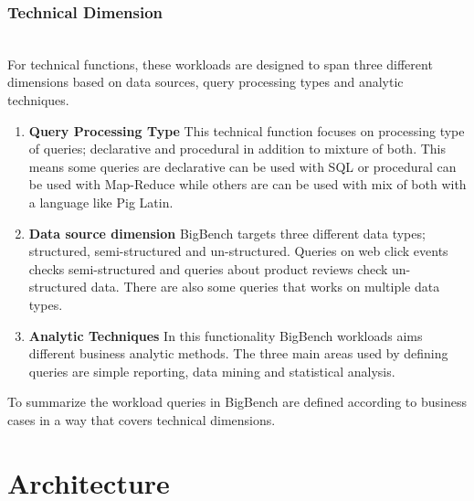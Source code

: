 \documentclass[sigconf,10pt]{acmart}
\begin{document}
\subsubsection{Technical Dimension} \hfill\\
For technical functions, these workloads are designed to span three different dimensions based on data sources, query processing types and analytic techniques.
\begin{enumerate}
    \item \textbf{Query Processing Type}
    \newline
    This technical function focuses on processing type of queries; declarative and procedural in addition to mixture of both. This means some queries are declarative can be used with SQL or procedural can be used with Map-Reduce while others are can be used with mix of both with a language like Pig Latin.
    
    \item \textbf{Data source dimension}
    \newline
    BigBench targets three different data types; structured, semi-structured and un-structured. Queries on web click events checks semi-structured and queries about product reviews check un-structured data. There are also some queries that works on multiple data types.
    
    \item \textbf{Analytic Techniques}
    \newline
    In this functionality BigBench workloads aims different business analytic methods. The three main areas used by defining queries are simple reporting, data mining and statistical analysis. 
\end{enumerate}

To summarize the workload queries in BigBench are defined according to business cases in a way that covers technical dimensions.  

\section{Architecture}
\end{document}
